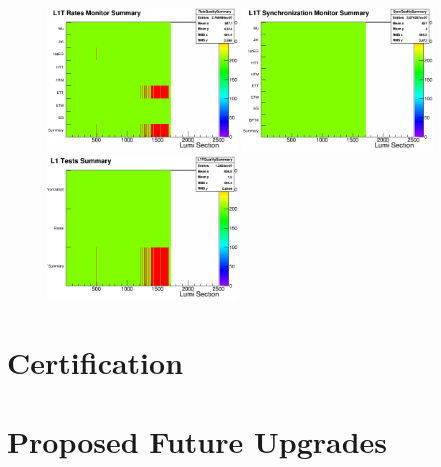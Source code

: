\begin{figure}[!htb]
\centering
\includegraphics[width=0.45\textwidth]{Chapter03/L1TOnline/Images/RateQualitySummary.png} 
\includegraphics[width=0.45\textwidth]{Chapter03/L1TOnline/Images/SyncQualitySummary.png} \\
\includegraphics[width=0.45\textwidth]{Chapter03/L1TOnline/Images/L1TQualitySummary.png}
\caption{}
\label{figure_ServiceWork_StatusSummary}
\end{figure}

\section{Certification}

\section{Proposed Future Upgrades}
